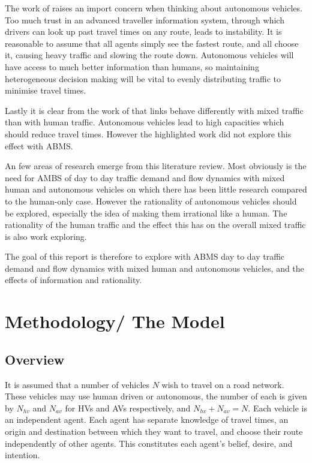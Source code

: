 \documentclass[12pt, a4paper, onecolumn]{article}
\begin{document}
The work of \cite{Liu2007} raises an import concern when thinking about autonomous vehicles. Too much trust in an advanced traveller information system, through which drivers can look up past travel times on any route, leads to instability. It is reasonable to assume that all agents simply see the fastest route, and all choose it, causing heavy traffic and slowing the route down. Autonomous vehicles will have access to much better information than humans, so maintaining heterogeneous decision making will be vital to evenly distributing traffic to minimise travel times. 

Lastly it is clear from the work of \cite{chen2017} that links behave differently with mixed traffic than with human traffic. Autonomous vehicles lead to high capacities which should reduce travel times. However the highlighted work did not explore this effect with ABMS.

An few areas of research emerge from this literature review. Most obviously is the need for AMBS of day to day traffic demand and flow dynamics with mixed human and autonomous vehicles on which there has been little research compared to the human-only case. However the rationality of autonomous vehicles should be explored, especially the idea of making them irrational like a human. The rationality of the human traffic and the effect this has on the overall mixed traffic is also work exploring. 

The goal of this report is therefore to explore with ABMS day to day traffic demand and flow dynamics with mixed human and autonomous vehicles, and the effects of information and rationality.

\pagebreak

\section{Methodology/ The Model}
\subsection{Overview}
It is assumed that a number of vehicles $N$ wish to travel on a road network. These vehicles may use human driven or autonomous, the number of each is given by $N_{hv}$ and $N_{av}$ for HVs and AVs respectively, and $N_{hv} + N_{av} = N$. Each vehicle is an independent agent. Each agent has separate knowledge of travel times, an origin and destination between which they want to travel, and choose their route independently of other agents. This constitutes each agent's belief, desire, and intention.
\end{document}
